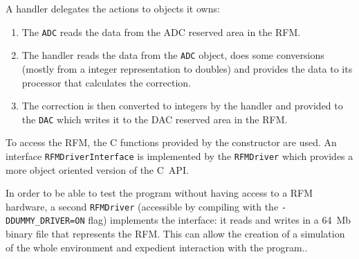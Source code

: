 A handler delegates the actions to objects it owns:
\begin{enumerate}
    \item The \texttt{ADC} reads the data from the ADC reserved area in the RFM.
    \item The handler reads the data from the \texttt{ADC} object, does some conversions (mostly from a integer representation to doubles) and provides the data to its processor that calculates the correction.
    \item The correction is then converted to integers by the handler and provided to the \texttt{DAC} which writes it to the DAC reserved area in the RFM.
\end{enumerate}

To access the RFM, the C functions provided by the constructor are used. An interface \texttt{RFMDriverInterface} is implemented by the \texttt{RFMDriver} which provides a more object oriented version of the C~API.

\remark In order to be able to test the program without having access to a RFM hardware, a second \texttt{RFMDriver} (accessible by compiling with the \texttt{-DDUMMY\_DRIVER=ON} flag) implements the interface: it reads and writes in a 64~Mb binary file that represents the RFM. This can allow the creation of a simulation of the whole environment and expedient interaction with the program..

